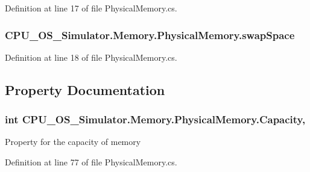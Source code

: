 Definition at line 17 of file Physical\+Memory.\+cs.

\hypertarget{class_c_p_u___o_s___simulator_1_1_memory_1_1_physical_memory_a0dedf020af5760e7c9875e4bcc9f5990}{}
\subsubsection[{swap\+Space}]{ C\+P\+U\+\_\+\+O\+S\+\_\+\+Simulator.\+Memory.\+Physical\+Memory.\+swap\+Space\hspace{0.3cm}{\ttfamily [private]}}\label{class_c_p_u___o_s___simulator_1_1_memory_1_1_physical_memory_a0dedf020af5760e7c9875e4bcc9f5990}


Definition at line 18 of file Physical\+Memory.\+cs.



\subsection{Property Documentation}
\hypertarget{class_c_p_u___o_s___simulator_1_1_memory_1_1_physical_memory_af04d50462367295af1c8b4f9f1a75730}{}
\subsubsection[{Capacity}]{\setlength{\rightskip}{0pt plus 5cm}int C\+P\+U\+\_\+\+O\+S\+\_\+\+Simulator.\+Memory.\+Physical\+Memory.\+Capacity\hspace{0.3cm}{\ttfamily [get]}, {\ttfamily [set]}}\label{class_c_p_u___o_s___simulator_1_1_memory_1_1_physical_memory_af04d50462367295af1c8b4f9f1a75730}


Property for the capacity of memory 



Definition at line 77 of file Physical\+Memory.\+cs.

